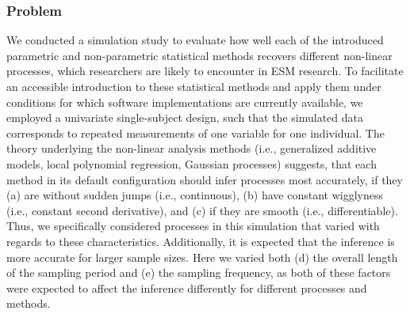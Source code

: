 
\subsubsection{Problem}

We conducted a simulation study to evaluate how well each of the introduced
parametric and non-parametric statistical methods recovers different
non-linear processes, which researchers are likely to encounter in ESM
research. To facilitate an accessible introduction to these statistical methods
and apply them under conditions for which software implementations are
currently available, we employed a univariate single-subject design, such that
the simulated data corresponds to repeated measurements of one variable for one
individual. The theory underlying the non-linear analysis methods
(i.e., generalized additive models, local polynomial regression,
Gaussian processes) suggests, that each method in its default configuration
should infer processes most accurately, if they
(a) are without sudden jumps (i.e., continuous),
(b) have constant wigglyness (i.e., constant second derivative), and
(c) if they are smooth (i.e., differentiable).
Thus, we specifically considered processes in this simulation that varied with
regards to these characteristics. Additionally, it is expected that
the inference is more accurate for larger sample sizes. Here we varied both
(d) the overall length of the sampling period and
(e) the sampling frequency, as both of these factors were expected to affect
the inference differently for different processes and methods.

